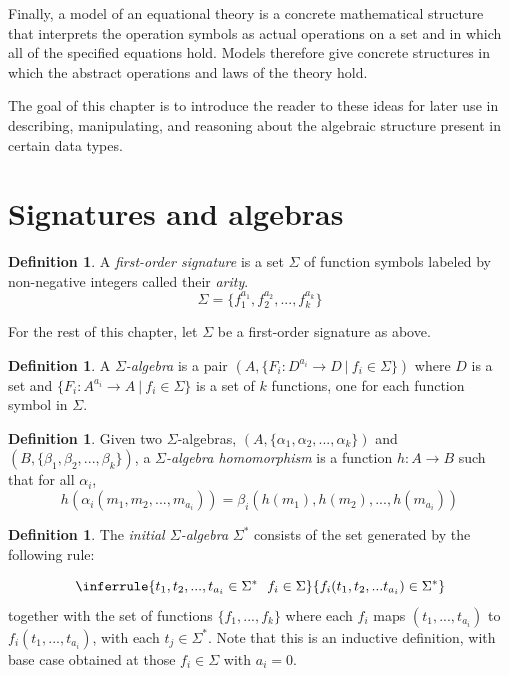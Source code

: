 \documentclass{msthesis}
\theoremstyle{definition}
\newtheorem{definition}[theorem]{Definition}
\begin{document}
Finally, a model of an equational theory is a concrete mathematical structure that interprets the operation symbols as actual operations on a set and in which all of the specified equations hold. Models therefore give concrete structures in which the abstract operations and laws of the theory hold.

The goal of this chapter is to introduce the reader to these ideas for later use in describing, manipulating, and reasoning about the algebraic structure present in certain data types.

\section{Signatures and algebras}
\begin{definition}
A \emph{first-order signature} is a set $\Sigma$ of function symbols labeled by non-negative integers called their \emph{arity}.
\[ \Sigma = \{f_1^{a_1}, f_2^{a_2}, ..., f_k^{a_k}\}\]
\end{definition}

For the rest of this chapter, let $\Sigma$ be a first-order signature as above.

\begin{definition}
    A \emph{$\Sigma$-algebra} is a pair $(A, \{F_i : D^{a_i} \to D\ |\ f_i \in \Sigma\})$ where $D$ is a set and $\{F_i : A^{a_i} \to A\ |\ f_i \in \Sigma\}$ is a set of $k$ functions, one for each function symbol in $\Sigma$.  
\end{definition}

\begin{definition}\label{def:sig_hom}
    Given two $\Sigma$-algebras, $(A, \{\alpha_1, \alpha_2, ..., \alpha_k\})$ and $(B, \{\beta_1, \beta_2, ..., \beta_k\})$, a \emph{$\Sigma$-algebra homomorphism} is a function $h : A \to B$ such that for all $\alpha_i$,
    \[ h(\alpha_i(m_1, m_2, ..., m_{a_i})) = \beta_i(h(m_1), h(m_2), ..., h(m_{a_i})) \]
\end{definition}



\begin{definition}
The \emph{initial $\Sigma$-algebra} $\Sigma^*$ consists of the set generated by the following rule:

\[ \inferrule{
        t_1, t_2, ... , t_{a_i} \in \Sigma^*\ \ f_i \in \Sigma
    }{
        f_i(t_1, t_2, ... t_{a_i}) \in \Sigma^*
    } \]
together with the set of functions $\{f_1, ..., f_k\}$ where each $f_i$ maps $(t_1, ..., t_{a_i})$ to $f_i(t_1, ..., t_{a_i})$, with each $t_j \in \Sigma^*$. 
Note that this is an inductive definition, with base case obtained at those $f_i \in \Sigma$ with $a_i = 0$.
\end{definition}
\end{document}
